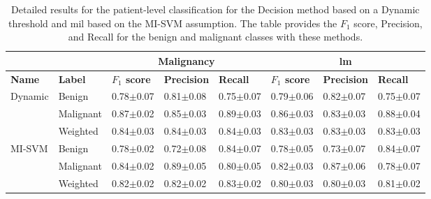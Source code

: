 \documentclass[journal,article,accept,moreauthors,pdftex, applsci]{Definitions/mdpi}
\newcommand{\fscore}{$F_{1}$ score}
\begin{document}
\par
\begin{table}[H]
    \centering
    \begin{tabular}{lllll||lll}
                                &                   & \multicolumn{3}{c}{\textbf{Malignancy}}                               & \multicolumn{3}{c}{\textbf{\ac{lm}}}                                  \\ \hline
    \textbf{Name}               & \textbf{Label}    & \textbf{\fscore{}}     & \textbf{Precision}    & \textbf{Recall}       & \textbf{\fscore{}}     & \textbf{Precision}    & \textbf{Recall}       \\ \hline
    \multirow{3}{*}{Dynamic}    & Benign            & 0.78$\pm$0.07         & 0.81$\pm$0.08         & 0.75$\pm$0.07         & 0.79$\pm$0.06         & 0.82$\pm$0.07         & 0.75$\pm$0.07         \\ \cline{2-8}  
                                & Malignant         & 0.87$\pm$0.02         & 0.85$\pm$0.03         & 0.89$\pm$0.03         & 0.86$\pm$0.03         & 0.83$\pm$0.03         & 0.88$\pm$0.04         \\ \cline{2-8} 
                                & Weighted          & 0.84$\pm$0.03         & 0.84$\pm$0.03         & 0.84$\pm$0.03         & 0.83$\pm$0.03         & 0.83$\pm$0.03         & 0.83$\pm$0.03         \\ \hline
    \multirow{3}{*}{MI-SVM}     & Benign            & 0.78$\pm$0.02         & 0.72$\pm$0.08         & 0.84$\pm$0.07         & 0.78$\pm$0.05         & 0.73$\pm$0.07         & 0.84$\pm$0.07         \\ \cline{2-8}
                                & Malignant         & 0.84$\pm$0.02         & 0.89$\pm$0.05         & 0.80$\pm$0.05         & 0.82$\pm$0.03         & 0.87$\pm$0.06         & 0.78$\pm$0.07         \\ \cline{2-8} 
                                & Weighted          & 0.82$\pm$0.02         & 0.82$\pm$0.02         & 0.83$\pm$0.02         & 0.80$\pm$0.03         & 0.80$\pm$0.03         & 0.81$\pm$0.02         \\ \hline 
    \end{tabular}    
    \caption{Detailed results for the patient-level classification for the Decision method based on a Dynamic threshold and \ac{mil} based on the MI-SVM assumption. The table provides the \fscore{}, Precision, and Recall for the benign and malignant classes with these methods.}
    \label{tab:patient_results_details}
\end{table}\par
\end{document}
